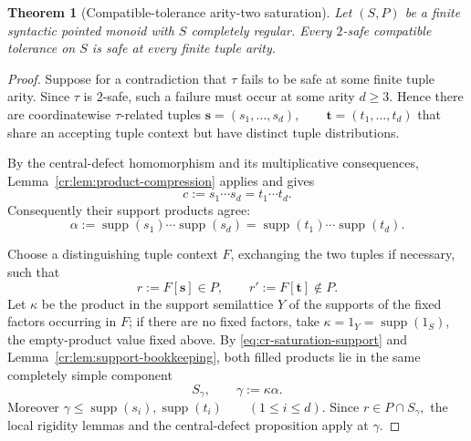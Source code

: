 \documentclass[10pt,a4paper]{article}
\newtheorem{theorem}{Theorem}[section]
\theoremstyle{definition}
\theoremstyle{remark}
\begin{document}
\begin{theorem}[Compatible-tolerance arity-two saturation]
\label{cr:thm:tolerance-saturation}
Let $(S,P)$ be a finite syntactic pointed monoid with $S$ completely regular.
Every $2$-safe compatible tolerance on $S$ is safe at every finite tuple
arity.
\end{theorem}

\begin{proof}
Suppose for a contradiction that $\tau$ fails to be safe at some finite tuple arity.  Since $\tau$ is $2$-safe, such a failure must occur at some arity \(d\ge3\).  Hence there are coordinatewise $\tau$-related tuples
\(\mathbf s=(s_1,\ldots,s_d), \qquad \mathbf t=(t_1,\ldots,t_d)\)
that share an accepting tuple context but have distinct tuple distributions.

By the central-defect homomorphism and its multiplicative consequences,
Lemma~\ref{cr:lem:product-compression} applies and gives
\begin{equation}
c
:=
s_1\cdots s_d
=
t_1\cdots t_d.
\label{eq:cr-saturation-product}
\end{equation}
Consequently their support products agree:
\begin{equation}
\alpha
:=
\operatorname{supp}(s_1)\cdots\operatorname{supp}(s_d)
=
\operatorname{supp}(t_1)\cdots\operatorname{supp}(t_d).
\label{eq:cr-saturation-support}
\end{equation}

Choose a distinguishing tuple context $F$, exchanging the two tuples if
necessary, such that
\begin{equation}
r:=F[\mathbf s]\in P,
\qquad
r':=F[\mathbf t]\notin P.
\label{eq:cr-distinguishing-context}
\end{equation}
Let $\kappa$ be the product in the support semilattice $Y$ of the supports of
the fixed factors occurring in $F$; if there are no fixed factors, take
$\kappa=1_Y=\operatorname{supp}(1_S)$, the empty-product value fixed above. By \eqref{eq:cr-saturation-support} and
Lemma~\ref{cr:lem:support-bookkeeping}, both filled products
lie in the same completely simple component
\begin{equation}
S_\gamma,
\qquad
\gamma:=\kappa\alpha.
\label{eq:cr-gamma-component}
\end{equation}
Moreover
\(\gamma \le \operatorname{supp}(s_i), \operatorname{supp}(t_i) \qquad(1\le i\le d).\)
Since \(r\in P\cap S_\gamma,\) the local rigidity lemmas and the central-defect proposition apply at $\gamma$.


\end{proof}
\end{document}
